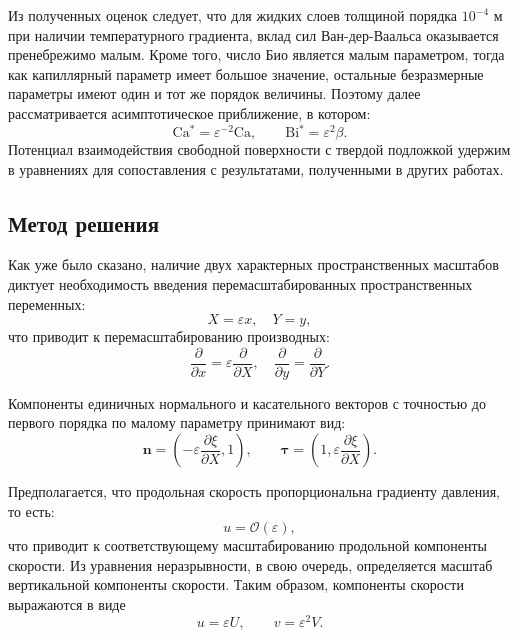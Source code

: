 \documentclass[12pt,a4paper]{article}
\begin{document}
Из полученных оценок следует, что для жидких слоев толщиной порядка $10^{-4}$ м при наличии температурного градиента, вклад сил Ван-дер-Ваальса оказывается пренебрежимо малым. Кроме того, число Био является малым параметром, тогда как капиллярный параметр имеет большое значение, остальные безразмерные параметры имеют один и тот же порядок величины. Поэтому далее рассматривается асимптотическое приближение, в котором:
\begin{equation}\label{eq:scaled_Ca_Bi}
	\mathrm{Ca^*}=\varepsilon^{-2}\mathrm{Ca},\qquad
	\mathrm{Bi^*}=\varepsilon^{2}\beta. 
\end{equation}
Потенциал взаимодействия свободной поверхности с твердой подложкой удержим в уравнениях для сопоставления с результатами, полученными в других работах. 

\subsection{Метод решения}


Как уже было сказано, наличие двух характерных пространственных масштабов диктует необходимость введения перемасштабированных пространственных переменных:
\begin{equation} \label{eq:stretched_x_y_vars_thermal}
	X = \varepsilon x, \quad Y = y,
\end{equation}
что приводит к перемасштабированию производных:
\begin{equation}
	\frac{\partial}{\partial x} = \varepsilon \frac{\partial}{\partial X}, \quad
	\frac{\partial}{\partial y} = \frac{\partial}{\partial Y}.
	\label{eq:scaled_derivatives_thermal}
\end{equation}

Компоненты единичных нормального и касательного векторов с точностью до первого порядка по малому параметру принимают вид:
\[
\mathbf{n} =
\left(
-\varepsilon \frac{\partial \xi}{\partial X}, 1
\right),
\qquad
\boldsymbol{\tau} =
\left(
1, \varepsilon \frac{\partial \xi}{\partial X}
\right).
\]

Предполагается, что продольная скорость пропорциональна градиенту давления, то есть:
\[
u = \mathcal{O}(\varepsilon),
\]
что приводит к соответствующему масштабированию продольной компоненты скорости. Из уравнения неразрывности, в свою очередь, определяется масштаб вертикальной компоненты скорости. Таким образом, компоненты скорости выражаются в виде
\begin{equation} \label{eq:stretched_velocity_eq_thermal}
	u = \varepsilon U, \qquad
	v = \varepsilon^2 V.
\end{equation}
\end{document}
